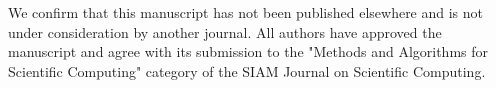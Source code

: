 \documentclass[11pt,a4paper,roman]{moderncv}        %
\begin{document}
We confirm that this manuscript has not been published elsewhere and is not under consideration by another journal. All authors have approved the manuscript and agree with its submission to the "Methods and Algorithms for Scientific Computing" category of the SIAM Journal on Scientific Computing.

\vspace{0.5cm}


\makeletterclosing
\end{document}
